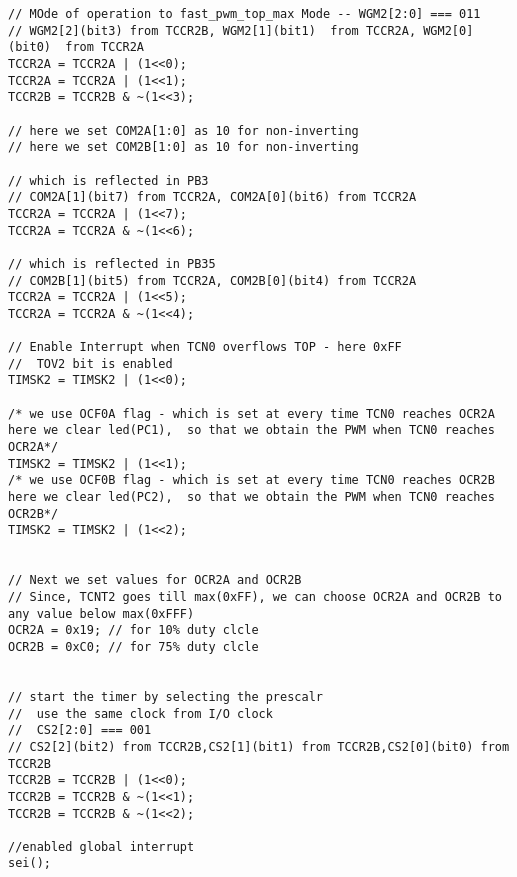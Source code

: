 \documentclass{article}
\begin{document}
\begin{verbatim}
// MOde of operation to fast_pwm_top_max Mode -- WGM2[2:0] === 011
// WGM2[2](bit3) from TCCR2B, WGM2[1](bit1)  from TCCR2A, WGM2[0](bit0)  from TCCR2A
TCCR2A = TCCR2A | (1<<0);
TCCR2A = TCCR2A | (1<<1);
TCCR2B = TCCR2B & ~(1<<3);	

// here we set COM2A[1:0] as 10 for non-inverting
// here we set COM2B[1:0] as 10 for non-inverting

// which is reflected in PB3
// COM2A[1](bit7) from TCCR2A, COM2A[0](bit6) from TCCR2A
TCCR2A = TCCR2A | (1<<7);
TCCR2A = TCCR2A & ~(1<<6);

// which is reflected in PB35
// COM2B[1](bit5) from TCCR2A, COM2B[0](bit4) from TCCR2A
TCCR2A = TCCR2A | (1<<5);
TCCR2A = TCCR2A & ~(1<<4);

// Enable Interrupt when TCN0 overflows TOP - here 0xFF
//  TOV2 bit is enabled
TIMSK2 = TIMSK2 | (1<<0);

/* we use OCF0A flag - which is set at every time TCN0 reaches OCR2A 
here we clear led(PC1),  so that we obtain the PWM when TCN0 reaches OCR2A*/
TIMSK2 = TIMSK2 | (1<<1);
/* we use OCF0B flag - which is set at every time TCN0 reaches OCR2B 
here we clear led(PC2),  so that we obtain the PWM when TCN0 reaches OCR2B*/
TIMSK2 = TIMSK2 | (1<<2);


// Next we set values for OCR2A and OCR2B
// Since, TCNT2 goes till max(0xFF), we can choose OCR2A and OCR2B to any value below max(0xFFF)
OCR2A = 0x19; // for 10% duty clcle
OCR2B = 0xC0; // for 75% duty clcle


// start the timer by selecting the prescalr
//  use the same clock from I/O clock
//  CS2[2:0] === 001
// CS2[2](bit2) from TCCR2B,CS2[1](bit1) from TCCR2B,CS2[0](bit0) from TCCR2B
TCCR2B = TCCR2B | (1<<0);
TCCR2B = TCCR2B & ~(1<<1);
TCCR2B = TCCR2B & ~(1<<2);

//enabled global interrupt
sei();
\end{verbatim}
\end{document}
